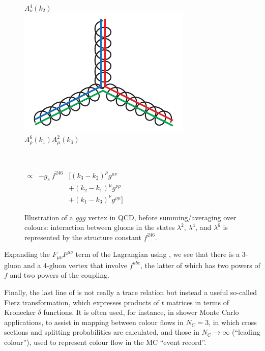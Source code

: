 \begin{figure}[t]
\begin{center}
\begin{minipage}[h]{4.6cm}
\begin{center}
$A_\nu^4(k_2)$\\
\includegraphics*[scale=0.75]{ggv.pdf}\\[-3mm]
$A^6_\rho(k_1)$\hfill$A_\mu^2(k_3)$
\end{center}
\end{minipage}~~~
\parbox{0.35\textwidth}{
$
\begin{array}{cccc}
\propto & - g_s \ f^{246} \!\! & \!\! [ (k_3 - k_2)^\rho g^{\mu\nu}  \\ 
& & +(k_2 - k_1)^\mu g^{\nu\rho} \\ 
& &+(k_1 - k_3)^\nu g^{\rho\mu}]
\end{array}
$}\vspace*{1mm}
\caption{Illustration of a $ggg$ vertex in QCD, before
  summing/averaging over colours: interaction between gluons in the 
  states $\lambda^2$, $\lambda^4$, and $\lambda^6$ is represented by
  the structure constant $f^{246}$. 
\label{fig:gg}}
\end{center}
\end{figure}
 Expanding the $F_{\mu\nu}F^{\mu\nu}$ term of the
Lagrangian using , we see that there is a 3-gluon and a
4-gluon vertex that involve $f^{abc}$, the latter of which has two
powers of $f$ and two powers of the coupling. 

Finally, the last line of  is not really a trace
relation but instead a useful so-called Fierz transformation, which
expresses products of $t$ matrices in terms of Kronecker $\delta$ functions. 
It is often used, for instance, in shower Monte Carlo
applications, to assist in mapping between colour flows in $N_C = 3$,
in which cross sections and splitting probabilities are calculated, 
and those in $N_C\to\infty$ (``leading colour''), used to represent colour flow in
the MC ``event record''.

